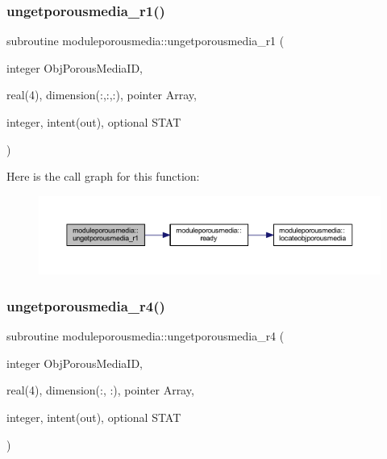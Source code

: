 \subsubsection{\texorpdfstring{ungetporousmedia\+\_\+r1()}{ungetporousmedia\_r1()}}
{\footnotesize\ttfamily subroutine moduleporousmedia\+::ungetporousmedia\+\_\+r1 (\begin{DoxyParamCaption}\item[{integer}]{Obj\+Porous\+Media\+ID,  }\item[{real(4), dimension(\+:,\+:,\+:), pointer}]{Array,  }\item[{integer, intent(out), optional}]{S\+T\+AT }\end{DoxyParamCaption})\hspace{0.3cm}{\ttfamily [private]}}

Here is the call graph for this function\+:\nopagebreak
\begin{figure}[H]
\begin{center}
\leavevmode
\includegraphics[width=350pt]{namespacemoduleporousmedia_ac6425bf5e26a5219b8c52bbabeda12ce_cgraph}
\end{center}
\end{figure}
\mbox{\label{namespacemoduleporousmedia_a90cbc92ae3cf9c9c828403c5fdc6c414}} 
\subsubsection{\texorpdfstring{ungetporousmedia\+\_\+r4()}{ungetporousmedia\_r4()}}
{\footnotesize\ttfamily subroutine moduleporousmedia\+::ungetporousmedia\+\_\+r4 (\begin{DoxyParamCaption}\item[{integer}]{Obj\+Porous\+Media\+ID,  }\item[{real(4), dimension(\+:, \+:), pointer}]{Array,  }\item[{integer, intent(out), optional}]{S\+T\+AT }\end{DoxyParamCaption})\hspace{0.3cm}{\ttfamily [private]}}

